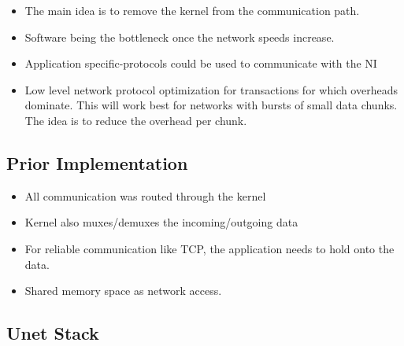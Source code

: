 \documentclass[a4paper]{article}
\begin{document}
\begin{itemize}
    \item 
    The main idea is to remove the kernel from the communication path.
    \item
    Software being the bottleneck once the network speeds increase.
    \item
    Application specific-protocols could be used to communicate with the NI
    \item
    Low level network protocol optimization for transactions for which overheads dominate. This will work best for networks with bursts of small data chunks. The idea is to reduce the overhead per chunk.
\end{itemize}

\subsection{Prior Implementation}

\begin{itemize}
    \item
    All communication was routed through the kernel
    \item
    Kernel also muxes/demuxes the incoming/outgoing data
    \item
    For reliable communication like TCP, the application needs to hold onto the data.
    \item 
    Shared memory space as network access.
\end{itemize}

\subsection{Unet Stack}
\end{document}
